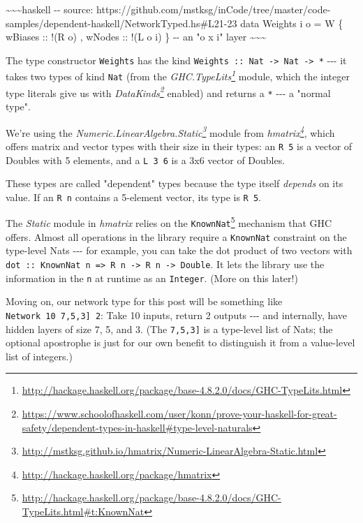 \documentclass[]{article}
\renewcommand{\href}[2]{#2\footnote{\url{#1}}}
\begin{document}
\textasciitilde{}\textasciitilde{}\textasciitilde{}haskell -\/- source:
https://github.com/mstksg/inCode/tree/master/code-samples/dependent-haskell/NetworkTyped.hs\#L21-23
data Weights i o = W \{ wBiases :: !(R o) , wNodes :: !(L o i) \} -\/- an "o x
i" layer \textasciitilde{}\textasciitilde{}\textasciitilde{}

The type constructor \texttt{Weights} has the kind
\texttt{Weights\ ::\ Nat\ -\textgreater{}\ Nat\ -\textgreater{}\ *} -\/-\/- it
takes two types of kind \texttt{Nat} (from the
\emph{\href{http://hackage.haskell.org/package/base-4.8.2.0/docs/GHC-TypeLits.html}{GHC.TypeLits}}
module, which the integer type literals give us with
\emph{\href{https://www.schoolofhaskell.com/user/konn/prove-your-haskell-for-great-safety/dependent-types-in-haskell\#type-level-naturals}{DataKinds}}
enabled) and returns a \texttt{*} -\/-\/- a "normal type".

We're using the
\emph{\href{http://mstksg.github.io/hmatrix/Numeric-LinearAlgebra-Static.html}{Numeric.LinearAlgebra.Static}}
module from \emph{\href{http://hackage.haskell.org/package/hmatrix}{hmatrix}},
which offers matrix and vector types with their size in their types: an
\texttt{R\ 5} is a vector of Doubles with 5 elements, and a \texttt{L\ 3\ 6} is
a 3x6 vector of Doubles.

These types are called "dependent" types because the type itself \emph{depends}
on its value. If an \texttt{R\ n} contains a 5-element vector, its type is
\texttt{R\ 5}.

The \emph{Static} module in \emph{hmatrix} relies on the
\href{http://hackage.haskell.org/package/base-4.8.2.0/docs/GHC-TypeLits.html\#t:KnownNat}{\texttt{KnownNat}}
mechanism that GHC offers. Almost all operations in the library require a
\texttt{KnownNat} constraint on the type-level Nats -\/-\/- for example, you can
take the dot product of two vectors with
\texttt{dot\ ::\ KnownNat\ n\ =\textgreater{}\ R\ n\ -\textgreater{}\ R\ n\ -\textgreater{}\ Double}.
It lets the library use the information in the \texttt{n} at runtime as an
\texttt{Integer}. (More on this later!)

Moving on, our network type for this post will be something like
\texttt{Network\ 10\ \textquotesingle{}{[}7,5,3{]}\ 2}: Take 10 inputs, return 2
outputs -\/-\/- and internally, have hidden layers of size 7, 5, and 3. (The
\texttt{\textquotesingle{}{[}7,5,3{]}} is a type-level list of Nats; the
optional \texttt{\textquotesingle{}} apostrophe is just for our own benefit to
distinguish it from a value-level list of integers.)
\end{document}
